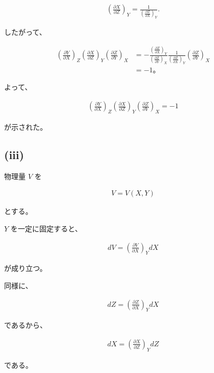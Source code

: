 \documentclass[platex,dvipdfmx,a4paper]{jsarticle}
\begin{document}
\begin{align*}
\left(\frac{\partial X}{\partial Z}\right)_Y
=
\frac{1}{
\left(\frac{\partial Z}{\partial X}\right)_Y
}.
\end{align*}

したがって、

\begin{align*}
\left(\frac{\partial Y}{\partial X}\right)_Z
\left(\frac{\partial X}{\partial Z}\right)_Y
\left(\frac{\partial Z}{\partial Y}\right)_X
&=
-
\frac{
\left(\frac{\partial Z}{\partial X}\right)_Y
}{
\left(\frac{\partial Z}{\partial Y}\right)_X
}
\frac{
1
}{
\left(\frac{\partial Z}{\partial X}\right)_Y
}
\left(\frac{\partial Z}{\partial Y}\right)_X \\
&=
-1。
\end{align*}

よって、

\begin{align*}
\left(\frac{\partial Y}{\partial X}\right)_Z
\left(\frac{\partial X}{\partial Z}\right)_Y
\left(\frac{\partial Z}{\partial Y}\right)_X
=
-1
\end{align*}

が示された。

\subsection{(iii)}

物理量 $V$ を

\begin{align*}
V=V(X,Y)
\end{align*}

とする。

$Y$ を一定に固定すると、

\begin{align*}
dV
=
\left(\frac{\partial V}{\partial X}\right)_Y dX
\end{align*}

が成り立つ。

同様に、

\begin{align*}
dZ
=
\left(\frac{\partial Z}{\partial X}\right)_Y dX
\end{align*}

であるから、

\begin{align*}
dX
=
\left(\frac{\partial X}{\partial Z}\right)_Y dZ
\end{align*}

である。
\end{document}
